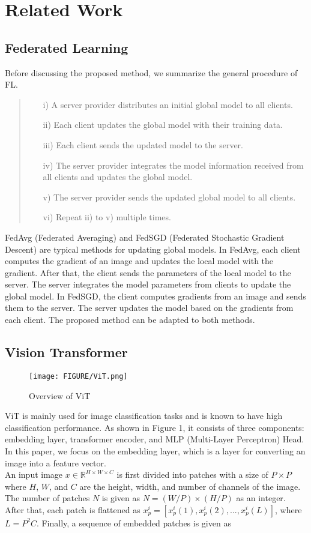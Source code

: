 \documentclass[conference, a4paper]{IEEEtran}
\begin{document}
\section{Related Work}
\subsection{Federated Learning}
Before discussing the proposed method, we summarize the general procedure of FL.
\begin{quote}
 \begin{itemize}
  \item[i)] A server provider distributes an initial global model to all clients.
  \item[ii)] Each client updates the global model with their training data.
  \item[iii)] Each client sends the updated model to the server.
  \item[iv)] The server provider integrates the model information received from all clients and updates the global model.
  \item[v)] The server provider sends the updated global model to all clients.
  \item[vi)] Repeat ii) to v) multiple times.
 \end{itemize}
\end{quote}
FedAvg (Federated Averaging)\cite{pmlr-v54-mcmahan17a} and FedSGD (Federated Stochastic Gradient Descent)\cite{pmlr-v54-mcmahan17a} are typical methods for updating global models.
In FedAvg, each client computes the gradient of an image and updates the local model with the gradient. After that, the client sends the parameters of the local model to the server. The server integrates the model parameters from clients to update the global model. In FedSGD, the client computes gradients from an image and sends them to the server. The server updates the model based on the gradients from each client. The proposed method can be adapted to both methods.
\subsection{Vision Transformer}
\begin{figure}[bth]
    \centering
    \texttt{[image: FIGURE/ViT.png]}
    \caption{Overview of ViT}
\end{figure}
ViT is mainly used for image classification tasks and is known to have high classification performance\cite{ViT}. As shown in Figure 1, it consists of three components: embedding layer, transformer encoder, and MLP (Multi-Layer Perceptron) Head. In this paper, we focus on the embedding layer, which is a layer for converting an image into a feature vector.\\
\indent An input image $x\in{\mathbb{R}^{H \times W \times C}}$ is first divided into patches with a size of $P \times P$ where $H$, $W$, and $C$ are the height, width, and number of channels of the image. The number of patches $N$ is given as $N = (W/P) \times (H/P)$ as an integer. After that, each patch is flattened as $x_p^i = [x_p^i(1), x_p^i(2), ..., x_p^i(L)]$, where $L=P^2C$. Finally, a sequence of embedded patches is given as
\end{document}
